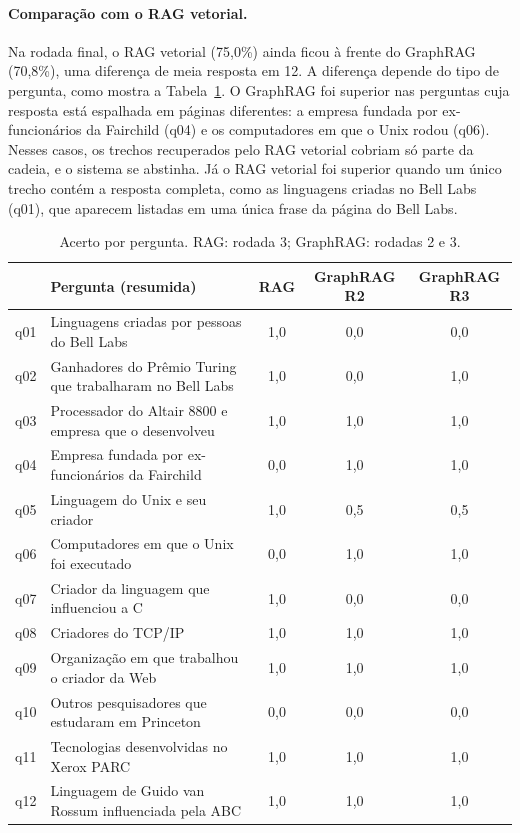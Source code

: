 \paragraph{Comparação com o RAG vetorial.} Na rodada final, o RAG vetorial (75,0\%) ainda ficou à frente do GraphRAG (70,8\%), uma diferença de meia resposta em 12. A diferença depende do tipo de pergunta, como mostra a Tabela~\ref{tab:por-pergunta}. O GraphRAG foi superior nas perguntas cuja resposta está espalhada em páginas diferentes: a empresa fundada por ex-funcionários da Fairchild (q04) e os computadores em que o Unix rodou (q06). Nesses casos, os trechos recuperados pelo RAG vetorial cobriam só parte da cadeia, e o sistema se abstinha. Já o RAG vetorial foi superior quando um único trecho contém a resposta completa, como as linguagens criadas no Bell Labs (q01), que aparecem listadas em uma única frase da página do Bell Labs.

\begin{table}[ht]
\centering
\caption{Acerto por pergunta. RAG: rodada 3; GraphRAG: rodadas 2 e 3.}
\label{tab:por-pergunta}
\small
\begin{tabularx}{\textwidth}{lXccc}
\toprule
 & \textbf{Pergunta (resumida)} & \textbf{RAG} & \textbf{GraphRAG R2} & \textbf{GraphRAG R3} \\
\midrule
q01 & Linguagens criadas por pessoas do Bell Labs & 1,0 & 0,0 & 0,0 \\
q02 & Ganhadores do Prêmio Turing que trabalharam no Bell Labs & 1,0 & 0,0 & 1,0 \\
q03 & Processador do Altair 8800 e empresa que o desenvolveu & 1,0 & 1,0 & 1,0 \\
q04 & Empresa fundada por ex-funcionários da Fairchild & 0,0 & 1,0 & 1,0 \\
q05 & Linguagem do Unix e seu criador & 1,0 & 0,5 & 0,5 \\
q06 & Computadores em que o Unix foi executado & 0,0 & 1,0 & 1,0 \\
q07 & Criador da linguagem que influenciou a C & 1,0 & 0,0 & 0,0 \\
q08 & Criadores do TCP/IP & 1,0 & 1,0 & 1,0 \\
q09 & Organização em que trabalhou o criador da Web & 1,0 & 1,0 & 1,0 \\
q10 & Outros pesquisadores que estudaram em Princeton & 0,0 & 0,0 & 0,0 \\
q11 & Tecnologias desenvolvidas no Xerox PARC & 1,0 & 1,0 & 1,0 \\
q12 & Linguagem de Guido van Rossum influenciada pela ABC & 1,0 & 1,0 & 1,0 \\
\bottomrule
\end{tabularx}
\end{table}

